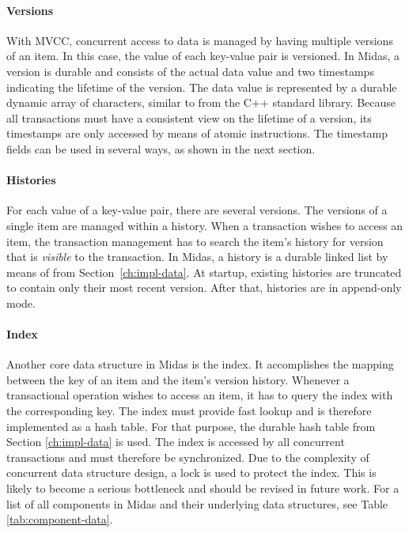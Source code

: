 \paragraph{Versions}

With MVCC, concurrent access to data is managed by having multiple versions of an item. In this case, the value of each key-value pair is versioned. In Midas, a version is durable and consists of the actual data value and two timestamps indicating the lifetime of the version. The data value is represented by a durable dynamic array of characters, similar to  from the C++ standard library. Because all transactions must have a consistent view on the lifetime of a version, its timestamps are only accessed by means of atomic instructions. The timestamp fields can be used in several ways, as shown in the next section.

\paragraph{Histories}

For each value of a key-value pair, there are several versions. The versions of a single item are managed within a history. When a transaction wishes to access an item, the transaction management has to search the item's history for version that is \emph{visible} to the transaction. In Midas, a history is a durable linked list by means of  from Section~\ref{ch:impl-data}. At startup, existing histories are truncated to contain only their most recent version. After that, histories are in append-only mode.

\paragraph{Index}

Another core data structure in Midas is the index. It accomplishes the mapping between the key of an item and the item's version history. Whenever a transactional operation wishes to access an item, it has to query the index with the corresponding key. The index must provide fast lookup and is therefore implemented as a hash table. For that purpose, the durable hash table  from Section \ref{ch:impl-data} is used. The index is accessed by all concurrent transactions and must therefore be synchronized. Due to the complexity of concurrent data structure design, a lock is used to protect the index. This is likely to become a serious bottleneck and should be revised in future work. For a list of all components in Midas and their underlying data structures, see Table \ref{tab:component-data}.

